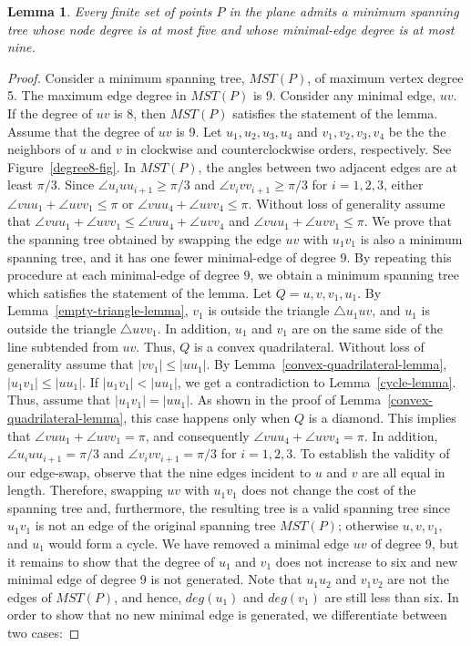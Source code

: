 \documentclass[11pt,a4paper]{article}
\newcommand{\dg}[1]{deg(#1)}
\newtheorem{lemma}{Lemma}
\begin{document}
\begin{lemma} 
\label{edge-degree-lemma}
Every finite set of points $P$ in the plane admits a minimum spanning tree whose node degree is at most five and whose minimal-edge degree is at most nine.
\end{lemma}
\begin{proof}
Consider a minimum spanning tree, $MST(P)$, of maximum vertex degree 5. The maximum edge degree in $MST(P)$ is 9. Consider any minimal edge, $uv$. If the degree of $uv$ is 8, then $MST(P)$ satisfies the statement of the lemma. Assume that the degree of $uv$ is 9. Let $u_1, u_2,u_3,u_4$ and $v_1, v_2,v_3,v_4$ be the the neighbors of $u$ and $v$ in clockwise and counterclockwise orders, respectively. See Figure~\ref{degree8-fig}. In $MST(P)$, the angles between two adjacent edges are at least $\pi/3$. Since $\angle u_iuu_{i+1}\ge \pi/3$ and $\angle v_ivv_{i+1}\ge \pi/3$ for $i=1,2,3$, either $\angle vuu_1+\angle uvv_1\le \pi$ or $\angle vuu_4+\angle uvv_4\le \pi$. Without loss of generality assume that $\angle vuu_1+\angle uvv_1\le \angle vuu_4+\angle uvv_4$ and $\angle vuu_1+\angle uvv_1\le \pi$. We prove that the spanning tree
obtained by swapping the edge $uv$ with $u_1v_1$ is also a minimum spanning tree, and it has one fewer minimal-edge of degree 9. By repeating this procedure at each minimal-edge of degree 9, we obtain a minimum spanning tree which satisfies the statement of the lemma. 
Let $Q=u,v,v_1,u_1$. By Lemma~\ref{empty-triangle-lemma}, $v_1$ is outside the triangle $\bigtriangleup u_1uv$, and $u_1$ is outside the triangle $\bigtriangleup uvv_1$. In addition, $u_1$ and $v_1$ are on the same side of the line subtended from $uv$. Thus, $Q$ is a convex quadrilateral.
Without loss of generality assume that $|vv_1|\le |uu_1|$. By Lemma~\ref{convex-quadrilateral-lemma}, $|u_1v_1|\le |uu_1|$. If $|u_1v_1|< |uu_1|$, we get a contradiction to Lemma~\ref{cycle-lemma}. Thus, assume that $|u_1v_1|= |uu_1|$. As shown in the proof of Lemma~\ref{convex-quadrilateral-lemma}, this case happens only when $Q$ is a diamond. This implies that $\angle vuu_1+\angle uvv_1=\pi$, and consequently $\angle vuu_4+\angle uvv_4= \pi$. In addition, $\angle u_iuu_{i+1}= \pi/3$ and $\angle v_ivv_{i+1}= \pi/3$ for $i=1,2,3$. To establish the validity of our edge-swap, observe that the nine edges incident to $u$ and $v$ are all equal in length. Therefore, swapping $uv$ with $u_1v_1$ does not change the cost of the spanning tree and, furthermore, the resulting tree is a valid spanning tree
since $u_1v_1$ is not an edge of the original spanning tree $MST(P)$; otherwise $u,v,v_1$, and $u_1$ would form a cycle. We have removed a minimal edge $uv$ of degree 9, but it remains to show that the degree of $u_1$ and $v_1$ does not increase to six and new minimal edge of degree 9 is not generated. Note that $u_1u_2$ and $v_1v_2$ are not the edges of $MST(P)$, and hence, $\dg{u_1}$ and $\dg{v_1}$ are still less than six. In order to show that no new minimal edge is generated, we differentiate between two cases:


\end{proof}
\end{document}

